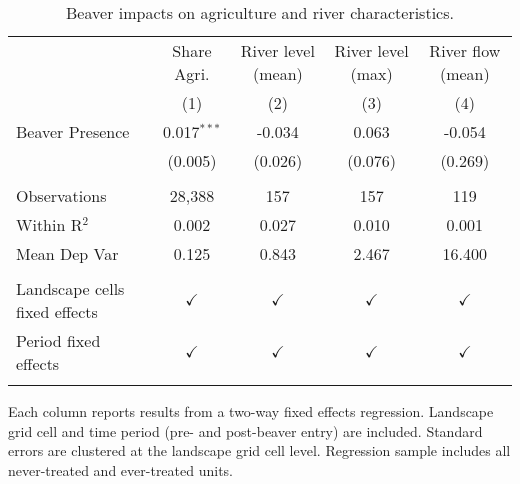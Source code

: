 \begin{table}[htbp]
   \caption{Beaver impacts on agriculture and river characteristics.}
   \bigskip
   \centering
   \begin{tabular}{lcccc}
      \tabularnewline\midrule\midrule
                                    & Share Agri.   & River level (mean) & River level (max) & River flow (mean)\\  
                                    & (1)           & (2)                & (3)               & (4)\\  
      \midrule 
      Beaver Presence               & 0.017$^{***}$ & -0.034             & 0.063             & -0.054\\   
                                    & (0.005)       & (0.026)            & (0.076)           & (0.269)\\   
       \\
      Observations                  & 28,388        & 157                & 157               & 119\\  
      Within R$^2$                  & 0.002         & 0.027              & 0.010             & 0.001\\  
      Mean Dep Var                  & 0.125         & 0.843              & 2.467             & 16.400\\  
       \\
      Landscape cells fixed effects & $\checkmark$  & $\checkmark$       & $\checkmark$      & $\checkmark$\\   
      Period fixed effects          & $\checkmark$  & $\checkmark$       & $\checkmark$      & $\checkmark$\\   
      \midrule \midrule & \tabularnewline
   \end{tabular}
   
   \par \raggedright 
   Each column reports results from a two-way fixed effects regression.   Landscape grid cell and time period (pre- and post-beaver entry) are included.   Standard errors are clustered at the landscape grid cell level.   Regression sample includes all never-treated and ever-treated units.
\end{table}
